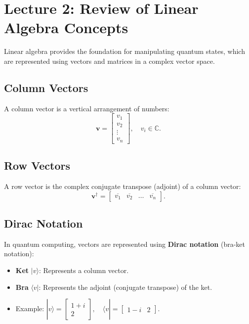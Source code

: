 \section{Lecture 2: Review of Linear Algebra Concepts}

Linear algebra provides the foundation for manipulating quantum states, which
are represented using vectors and matrices in a complex vector space.


\subsection*{Column Vectors}
A column vector is a vertical arrangement of numbers:
\[
  \mathbf{v} =
  \begin{bmatrix}
    v_1 \\
    v_2 \\
    \vdots \\
    v_n
  \end{bmatrix}, \quad v_i \in \mathbb{C}.
\]

\subsection*{Row Vectors}
A row vector is the complex conjugate transpose (adjoint) of a column vector:
\[
  \mathbf{v}^\dagger =
  \begin{bmatrix}
    \overline{v_1} & \overline{v_2} & \dots & \overline{v_n}
  \end{bmatrix}.
\]

\subsection*{Dirac Notation}
In quantum computing, vectors are represented using \textbf{Dirac notation}
(bra-ket notation):
\begin{itemize}
  \item \textbf{Ket} \( |v\rangle \): Represents a column vector.
  \item \textbf{Bra} \( \langle v | \): Represents the adjoint (conjugate
    transpose) of the ket.
  \item Example: \( |v\rangle = \begin{bmatrix} 1 + i \\ 2 \end{bmatrix},
    \quad \langle v | = \begin{bmatrix} 1 - i & 2 \end{bmatrix} \).
\end{itemize}

